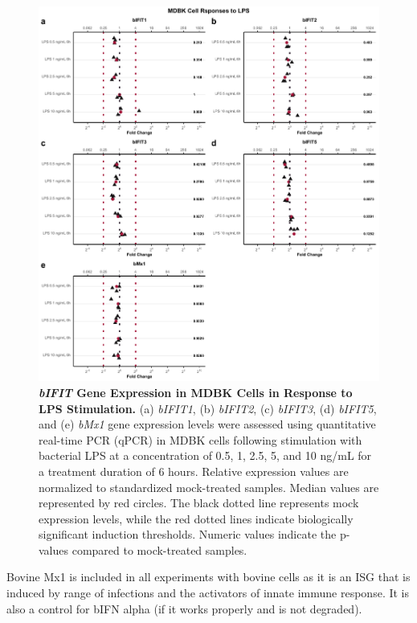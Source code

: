 \begin{figure}
    \centering
    \includegraphics[width=1\linewidth]{07. Chapter 2/Figs/02. Induction/02. mdbk_treat_lps.pdf}
    \caption[\textit{bIFIT} Gene Expression in MDBK Cells in Response to LPS Stimulation.]{\textbf{\textit{bIFIT} Gene Expression in MDBK Cells in Response to LPS Stimulation.} (a) \textit{bIFIT1}, (b) \textit{bIFIT2}, (c) \textit{bIFIT3}, (d) \textit{bIFIT5}, and (e) \textit{bMx1} gene expression levels were assessed using quantitative real-time PCR (qPCR) in MDBK cells following stimulation with bacterial LPS at a concentration of 0.5, 1, 2.5, 5, and 10 ng/mL for a treatment duration of 6 hours. Relative expression values are normalized to standardized mock-treated samples. Median values are represented by red circles. The black dotted line represents mock expression levels, while the red dotted lines indicate biologically significant induction thresholds. Numeric values indicate the p-values compared to mock-treated samples.}
    \label{fig:MDBK responses to LPS}
\end{figure}


Bovine Mx1 is included in all experiments with bovine cells as it is an ISG that is induced by range of infections and the activators of innate immune response. It is also a control for bIFN alpha (if it works properly and is not degraded).

